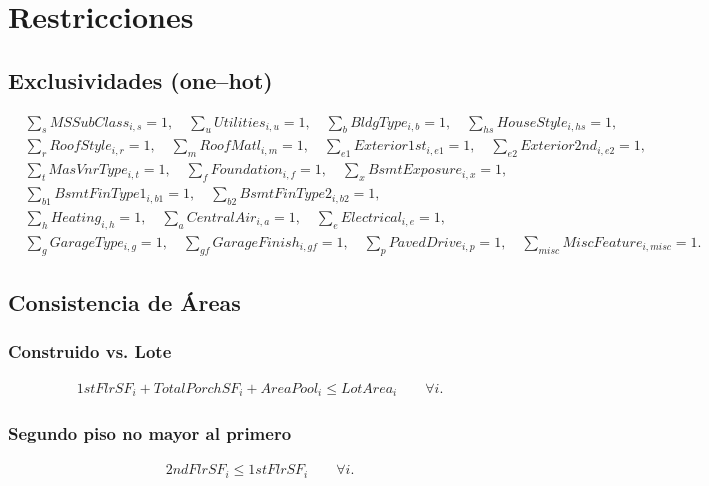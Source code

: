\section{Restricciones}
\subsection{Exclusividades (one–hot)}
\begin{align}
  &\sum_{s} MSSubClass_{i,s}=1, \quad
  \sum_{u} Utilities_{i,u}=1, \quad
  \sum_{b} BldgType_{i,b}= 1, \quad
  \sum_{hs} HouseStyle_{i,hs}=1, \\[4pt]
  &\sum_{r} RoofStyle_{i,r}=1, \quad
  \sum_{m} RoofMatl_{i,m}=1, \quad
  \sum_{e1} Exterior1st_{i,e1}=1, \quad
  \sum_{e2} Exterior2nd_{i,e2}=1, \\[4pt]
  &\sum_{t} MasVnrType_{i,t}=1, \quad
  \sum_{f} Foundation_{i,f}=1, \quad
  \sum_{x} BsmtExposure_{i,x}=1, \\[4pt]
  &\sum_{b1} BsmtFinType1_{i,b1}=1, \quad
  \sum_{b2} BsmtFinType2_{i,b2}=1, \\[4pt]
  &\sum_{h} Heating_{i,h}= 1,\quad
  \sum_{a} CentralAir_{i,a}=1, \quad
  \sum_{e} Electrical_{i,e}=1, \\[4pt]
  &\sum_{g} GarageType_{i,g}=1,\quad
  \sum_{gf} GarageFinish_{i,gf}=1,\quad
  \sum_{p} PavedDrive_{i,p}=1,\quad
  \sum_{misc} MiscFeature_{i,misc}=1.
\end{align}

\subsection{Consistencia de Áreas}
\subsubsection{Construido vs. Lote}
\begin{align}
1stFlrSF_{i} + TotalPorchSF_{i} + AreaPool_{i} \leq LotArea_{i} \qquad \forall i.
\end{align}

\subsubsection{Segundo piso no mayor al primero}
\begin{align}
2ndFlrSF_{i} \leq 1stFlrSF_{i} \qquad \forall i.
\end{align}

